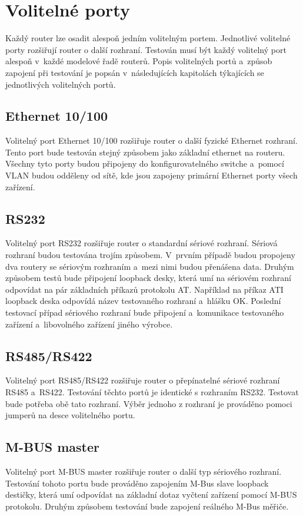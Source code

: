 \section{Volitelné porty}
Každý router lze osadit alespoň jedním volitelným portem. Jednotlivé volitelné porty rozšiřují router o další rozhraní. Testován musí být každý volitelný port alespoň v~každé modelové řadě routerů. Popis volitelných portů a~způsob zapojení při testování je popsán v~následujících kapitolách týkajících se jednotlivých volitelných portů.

\subsection{Ethernet 10/100}
Volitelný port Ethernet 10/100 rozšiřuje router o další fyzické Ethernet rozhraní. Tento port bude testován stejný způsobem jako základní ethernet na routeru. Všechny tyto porty budou připojeny do konfigurovatelného switche a~pomocí VLAN budou odděleny od sítě, kde jsou zapojeny primární Ethernet porty všech zařízení.

\subsection{RS232}
Volitelný port RS232 rozšiřuje router o standardní sériové rozhraní. Sériová rozhraní budou testována trojím způsobem. V~prvním případě budou propojeny dva routery se sériovým rozhraním a~mezi nimi budou přenášena data. Druhým způsobem testů bude připojení loopback desky, která umí na sériovém rozhraní odpovídat na pár základních příkazů protokolu AT. Například na příkaz ATI loopback deska odpovídá název testovaného rozhraní a~hlášku OK. Poslední testovací případ sériového rozhraní bude připojení a~komunikace testovaného zařízení a~libovolného zařízení jiného výrobce. \cite{port}

\subsection{RS485/RS422}
Volitelný port RS485/RS422 rozšiřuje router o přepínatelné sériové rozhraní RS485 a~RS422. Testování těchto portů je identické s rozhraním RS232. Testovat bude potřeba obě tato rozhraní. Výběr jednoho z rozhraní je prováděno pomoci jumperů na desce volitelného portu.

\subsection{M-BUS master}
Volitelný port M-BUS master rozšiřuje router o další typ sériového rozhraní. Testování tohoto portu bude prováděno zapojením M-Bus slave loopback destičky, která umí odpovídat na základní dotaz vyčtení zařízení pomocí M-BUS protokolu. Druhým způsobem testování bude zapojení reálného M-Bus měřiče.

